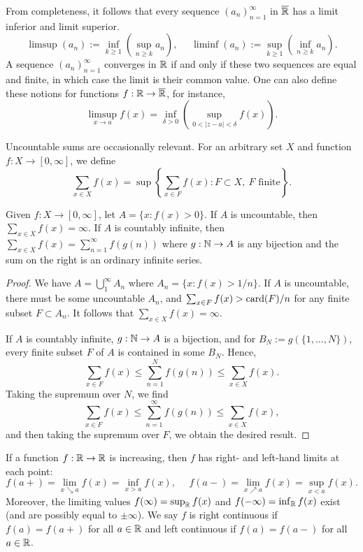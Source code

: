 \documentclass[12pt]{article} %
\begin{document}
From completeness, it follows that every sequence $(a_n)_{n=1}^{\infty}$ in $\overline{\mathbb{R}}$ has a limit inferior and limit superior. \[\limsup(a_n) := \inf_{k \geq 1} \left(\sup_{n \geq k} a_n \right), \ \ \ \ \ \ \liminf(a_n) := \sup_{k \geq 1} \left( \inf_{n \geq k} a_n \right).\]
A sequence $(a_n)_{n=1}^{\infty}$ converges in $\mathbb{R}$ if and only if these two sequences are equal and finite, in which case the limit is their common value. One can also define these notions for functions $f : \mathbb{R} \to \overline{\mathbb{R}}$, for instance, \[\limsup_{x \to a} f(x) = \inf_{\delta > 0} \left( \sup_{0 < |z-a| < \delta} f(x) \right).\]

Uncountable sums are occasionally relevant. For an arbitrary set $X$ and function $f : X \to [0,\infty]$, we define \[\sum_{x \in X} f(x) = \sup \left\{\sum_{x \in F} f(x) : F \subset X, \ \text{$F$ finite}\right\}.\]

\begin{proposition}
    Given $f : X \to [0,\infty]$, let $A = \{x : f(x) > 0\}$. If $A$ is uncountable, then $\sum_{x \in X}f(x) = \infty$. If $A$ is countably infinite, then $\sum_{x \in X} f(x) = \sum_{n=1}^{\infty}f(g(n))$ where $g : \mathbb{N} \to A$ is any bijection and the sum on the right is an ordinary infinite series.
\end{proposition}

\begin{proof}
    We have $A = \bigcup_{1}^{\infty} A_n$ where $A_n = \{x : f(x) > 1/n\}$. If $A$ is uncountable, there must be some uncountable $A_n$, and $\sum_{x \in F}f(x) > \operatorname{card}(F) / n$ for any finite subset $F \subset A_n$. It follows that $\sum_{x \in X}f(x) = \infty$.

    If $A$ is countably infinite, $g : \mathbb{N} \to A$ is a bijection, and for $B_N := g(\{1, \ldots, N\})$, every finite subset $F$ of $A$ is contained in some $B_N$. Hence, \[\sum_{x \in F} f(x) \leq \sum_{n=1}^{N} f(g(n)) \leq \sum_{x \in X} f(x).\] Taking the supremum over $N$, we find \[\sum_{x \in F} f(x) \leq \sum_{n=1}^{\infty} f(g(n)) \leq \sum_{x \in X} f(x),\] and then taking the supremum over $F$, we obtain the desired result.
\end{proof}

If a function $f : \mathbb{R} \to \mathbb{R}$ is increasing, then $f$ has right- and left-hand limits at each point: \[f(a+) = \lim_{x \searrow a} f(x) = \inf_{x > a} f(x), \ \ \ \ \ \ f(a-) = \lim_{x \nearrow a} f(x) = \sup_{x < a} f(x).\] Moreover, the limiting values $f(\infty) = \sup_{\mathbb{R}} f(x)$ and $f(-\infty) = \inf_{\mathbb{R}} f(x)$ exist (and are possibly equal to $\pm \infty$). We say $f$ is right continuous if $f(a) = f(a+)$ for all $a \in \mathbb{R}$ and left continuous if $f(a) = f(a-)$ for all $a \in \mathbb{R}$.
\end{document}
